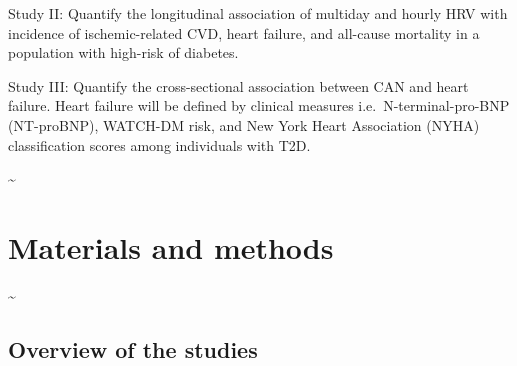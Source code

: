 \documentclass[
  a4paper,
  headsepline=true,
  open=any]{scrbook}
\begin{document}
Study II: Quantify the longitudinal association of multiday and hourly
HRV with incidence of ischemic-related CVD, heart failure, and all-cause
mortality in a population with high-risk of diabetes.

Study III: Quantify the cross-sectional association between CAN and
heart failure. Heart failure will be defined by clinical measures
i.e.~N-terminal-pro-BNP (NT-proBNP), WATCH-DM risk, and New York Heart
Association (NYHA) classification scores among individuals with T2D.

\newpage

\thispagestyle{empty}

\textasciitilde{} \newpage


\hypertarget{materials-and-methods}{%
\chapter{Materials and methods}\label{materials-and-methods}}

\newpage

\thispagestyle{empty}

\textasciitilde{} \newpage

\hypertarget{overview-of-the-studies}{%
\section{Overview of the studies}\label{overview-of-the-studies}}
\end{document}
